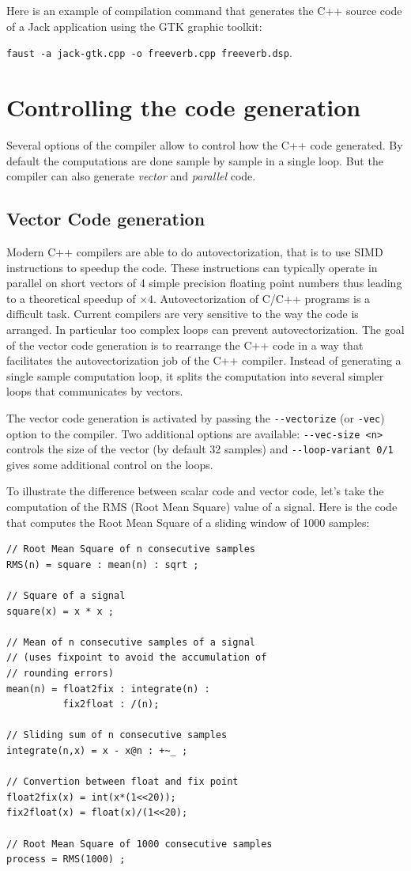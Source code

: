 \documentclass[a4paper,10pt]{book}
\begin{document}
\bigskip

Here is an example of compilation command that generates the C++ source code of a Jack application using the GTK graphic toolkit:

\texttt{faust -a jack-gtk.cpp -o freeverb.cpp freeverb.dsp}.

\bigskip

\chapter{Controlling the code generation}
Several options of the \faust compiler allow to control how the C++ code generated. By default the computations are done sample by sample in a single loop. But the compiler can also generate \textit{vector} and \textit{parallel} code.


\section{Vector Code generation}
Modern C++ compilers are able to do autovectorization, that is to use SIMD instructions to speedup the code. These instructions can typically operate in parallel on short vectors of 4 simple precision floating point numbers thus leading to a theoretical speedup of $\times4$. 
Autovectorization of C/C++ programs is a difficult task. Current compilers are very sensitive to the way the code is arranged. In particular too complex loops can prevent autovectorization. The goal of the vector code generation is to rearrange the C++ code in a way that facilitates the autovectorization job of the C++ compiler. Instead of generating a single sample computation loop, it splits the computation into several simpler loops that communicates by vectors.

The vector code generation is activated by passing the \lstinline!--vectorize! (or \lstinline!-vec!) option to the \faust compiler. Two additional options are available:  \lstinline!--vec-size <n>! controls the size of the vector (by default 32 samples) and \lstinline!--loop-variant 0/1! gives some additional control on the loops.  

To illustrate the difference between scalar code and vector code, let's take the computation of the RMS (Root Mean Square) value of a signal.  Here is the \faust code that computes the Root Mean Square of a sliding window of 1000 samples:
\label{rms}
\begin{lstlisting}
// Root Mean Square of n consecutive samples
RMS(n) = square : mean(n) : sqrt ;

// Square of a signal
square(x) = x * x ;

// Mean of n consecutive samples of a signal
// (uses fixpoint to avoid the accumulation of
// rounding errors) 
mean(n) = float2fix : integrate(n) : 
          fix2float : /(n); 

// Sliding sum of n consecutive samples
integrate(n,x) = x - x@n : +~_ ;

// Convertion between float and fix point
float2fix(x) = int(x*(1<<20));      
fix2float(x) = float(x)/(1<<20);    

// Root Mean Square of 1000 consecutive samples
process = RMS(1000) ;
\end{lstlisting}
\end{document}
